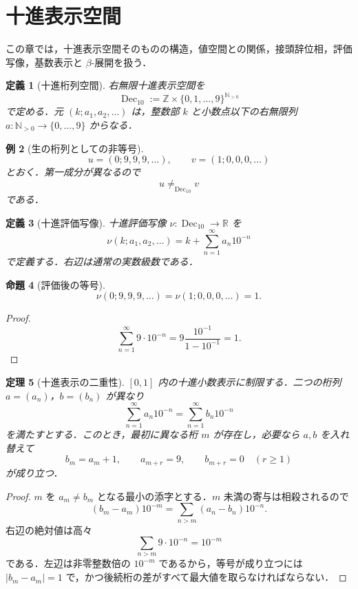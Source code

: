 \documentclass[a4paper,11pt]{ltjsarticle}
\theoremstyle{jpdef}
\newtheorem{definition}{定義}[section]
\newtheorem{example}[definition]{例}
\theoremstyle{jpthm}
\newtheorem{theorem}[definition]{定理}
\newtheorem{proposition}[definition]{命題}
\newcommand{\N}{\mathbb{N}}
\newcommand{\Z}{\mathbb{Z}}
\newcommand{\R}{\mathbb{R}}
\newcommand{\Dec}{\operatorname{Dec}_{10}}
\newcommand{\Ns}{\N_{>0}}
\begin{document}
\section{十進表示空間}

この章では，十進表示空間そのものの構造，値空間との関係，接頭辞位相，評価写像，基数表示と \(\beta\)-展開を扱う．

\begin{definition}[十進桁列空間]
右無限十進表示空間を
\[
  \Dec:=\Z\times\{0,1,\ldots,9\}^{\Ns}
\]
で定める．元 \((k;a_1,a_2,\ldots)\) は，整数部 \(k\) と小数点以下の右無限列 \(a:\Ns\to\{0,\ldots,9\}\) からなる．
\end{definition}

\begin{example}[生の桁列としての非等号]
\[
  u=(0;9,9,9,\ldots),\qquad v=(1;0,0,0,\ldots)
\]
とおく．第一成分が異なるので
\[
  u\ne_{\Dec}v
\]
である．
\end{example}

\begin{definition}[十進評価写像]
十進評価写像 \(\nu:\Dec\to\R\) を
\[
  \nu(k;a_1,a_2,\ldots)=k+\sum_{n=1}^{\infty}a_n10^{-n}
\]
で定義する．右辺は通常の実数級数である．
\end{definition}

\begin{proposition}[評価後の等号]
\[
  \nu(0;9,9,9,\ldots)=\nu(1;0,0,0,\ldots)=1.
\]
\end{proposition}

\begin{proof}
\[
  \sum_{n=1}^{\infty}9\cdot10^{-n}
  =9\frac{10^{-1}}{1-10^{-1}}=1.
\]
\end{proof}

\begin{theorem}[十進表示の二重性]
\([0,1]\) 内の十進小数表示に制限する．二つの桁列 \(a=(a_n)\)，\(b=(b_n)\) が異なり
\[
  \sum_{n=1}^{\infty}a_n10^{-n}=\sum_{n=1}^{\infty}b_n10^{-n}
\]
を満たすとする．このとき，最初に異なる桁 \(m\) が存在し，必要なら \(a,b\) を入れ替えて
\[
  b_m=a_m+1,
  \qquad
  a_{m+r}=9,
  \qquad
  b_{m+r}=0\quad(r\ge1)
\]
が成り立つ．
\end{theorem}

\begin{proof}
\(m\) を \(a_m\ne b_m\) となる最小の添字とする．\(m\) 未満の寄与は相殺されるので
\[
  (b_m-a_m)10^{-m}=\sum_{n>m}(a_n-b_n)10^{-n}.
\]
右辺の絶対値は高々
\[
  \sum_{n>m}9\cdot10^{-n}=10^{-m}
\]
である．左辺は非零整数倍の \(10^{-m}\) であるから，等号が成り立つには \(|b_m-a_m|=1\) で，かつ後続桁の差がすべて最大値を取らなければならない．
\end{proof}
\end{document}
